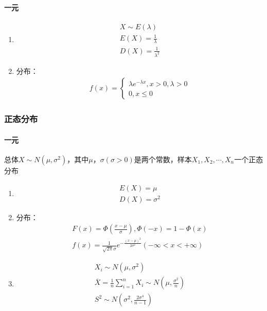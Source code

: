 \documentclass[12pt]{book}
\begin{document}
\paragraph{一元}

\begin{enumerate}[1.]
    \item \begin{gather*}
              X\sim E(\lambda) \\
              E(X)=\frac{1}{\lambda} \\
              D(X)=\frac{1}{\lambda^2}
          \end{gather*}
    \item 分布：
          \begin{gather*}
              f(x)=\begin{cases}
                  \lambda e^{-\lambda x}, x>0, λ>0 \\
                  0, x\leq 0
              \end{cases}
          \end{gather*}
\end{enumerate}






\subsubsection{正态分布}



\paragraph{一元} 

总体$X\sim N(\mu,\sigma^2)$，其中$\mu$，$\sigma(\sigma>0)$是两个常数，样本$X_1,X_2,\cdots,X_n$一个正态分布


\begin{enumerate}[1.]
    \item \begin{gather*}
        E(X)=\mu \\
        D(X)=\sigma^2 
    \end{gather*}
    \item 分布：
    \begin{gather*}
        F\left(x\right)=\Phi\left(\frac{x-\mu}{\sigma}\right), \Phi\left(-x\right)=1-\Phi\left(x\right)\\
        f\left(x\right)=\frac{1}{\sqrt{2\pi}\sigma}e^{-\frac{\left(x-\mu\right)^2}{2\sigma^2}}(-\infty<x<+\infty)
    \end{gather*}
    \item \begin{gather*}
        X_i\sim N(\mu,\sigma^2) \\
        \overline{X}=\frac{1}{n}\sum_{i=1}^{n}{X_i}\sim N\left(\mu,\frac{\sigma^2}{n}\right) \\
        S^2\sim N\left(\sigma^2,\frac{2\sigma^4}{n-1}\right) 
    \end{gather*}
\end{enumerate}
\end{document}
